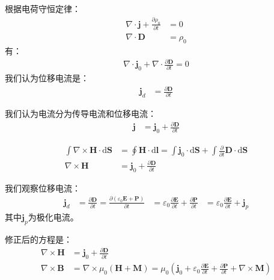 \documentclass[12pt,onecolumn,a4paper]{book}
\numberwithin{table}{subsection}
\numberwithin{equation}{subsection}
\begin{document}
    根据电荷守恒定律：
    \begin{align}
        \nabla \cdot \mathbf{j} + \frac{\partial \rho_0}{\partial t} & = 0      \\
        \nabla \cdot \mathbf{D}                                      & = \rho_0 
    \end{align}
    有：
    \begin{align}
        \nabla \cdot \mathbf{j}_0                                  + \nabla \cdot \frac{\partial \mathbf{D}}{\partial t} = 0
    \end{align}
    我们认为位移电流是：
    \begin{align}
        \mathbf{j}_d & = \frac{\partial \mathbf{D}}{\partial t}
    \end{align}

    我们认为电流分为传导电流和位移电流：
    \begin{align}
        \mathbf{j} & = \mathbf{j}_0 + \frac{\partial \mathbf{D}}{\partial t}
    \end{align}

    \begin{align}
        \int \nabla \times \mathbf{H} \cdot \mathrm{d} \mathbf{S} & = \oint \mathbf{H} \cdot \mathrm{d} \mathbf{l} = \int \mathbf{j}_0 \cdot \mathrm{d} \mathbf{S} + \int \frac{\partial}{\partial t}  \mathbf{D} \cdot \mathrm{d} \mathbf{S} \\
        \nabla \times \mathbf{H}                                  & = \mathbf{j}_0 + \frac{\partial \mathbf{D}}{\partial t}
    \end{align}

    我们观察位移电流：
    \begin{align}
        \mathbf{j}_d & = \frac{\partial \mathbf{D}}{\partial t} = \frac{\partial (\varepsilon_0 \mathbf{E} + \mathbf{P})}{\partial t}
                     & = \varepsilon_0 \frac{\partial \mathbf{E}}{\partial t} + \frac{\partial \mathbf{P}}{\partial t}
                     & = \varepsilon_0 \frac{\partial \mathbf{E}}{\partial t} + \mathbf{j}_p
    \end{align}
    其中$\mathbf{j}_p$为极化电流。

    修正后的方程是：
    \begin{align}
        \nabla \times \mathbf{H} & = \mathbf{j}_0 + \frac{\partial \mathbf{D}}{\partial t}                                                                                                                                        \\
        \nabla \times \mathbf{B} & =\nabla \times \mu_0(\mathbf{H} + \mathbf{M}) = \mu_0 (\mathbf{j}_0 + \varepsilon_0 \frac{\partial \mathbf{E}}{\partial t} + \frac{\partial \mathbf{P}}{\partial t} + \nabla \times\mathbf{M})
    \end{align}
\end{document}
